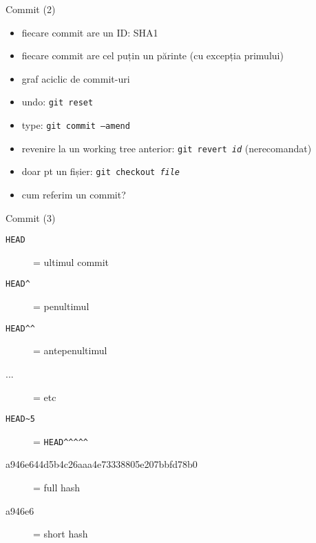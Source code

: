 \documentclass{beamer}
\begin{document}
\begin{frame}{Commit (2)}
  \begin{itemize}
    \item fiecare commit are un ID: SHA1
    \item fiecare commit are cel puțin un părinte (cu excepția primului)
    \item graf aciclic de commit-uri
    \pause
    \item undo: \texttt{git reset}
    \item type: \texttt{git commit --amend}
    \item revenire la un working tree anterior: \texttt{git revert \textit{id}}
    (nerecomandat)
    \item doar pt un fișier: \texttt{git checkout \textit{file}}
    \pause
    \item cum referim un commit?
  \end{itemize}
\end{frame}

\begin{frame}{Commit (3)}
  \begin{description}
    \item[\texttt{HEAD}] = ultimul commit
    \item[\texttt{HEAD\textasciicircum}] = penultimul
    \item[\texttt{HEAD\textasciicircum\textasciicircum}] = antepenultimul
    \item[...] = etc
    \pause
    \item[\texttt{HEAD\textasciitilde5}] = \texttt{HEAD\textasciicircum\textasciicircum\textasciicircum\textasciicircum\textasciicircum}
    \pause
    \item[a946e644d5b4c26aaa4e73338805e207bbfd78b0] = full hash
    \pause
    \item[a946e6] = short hash
  \end{description}
\end{frame}
\end{document}
